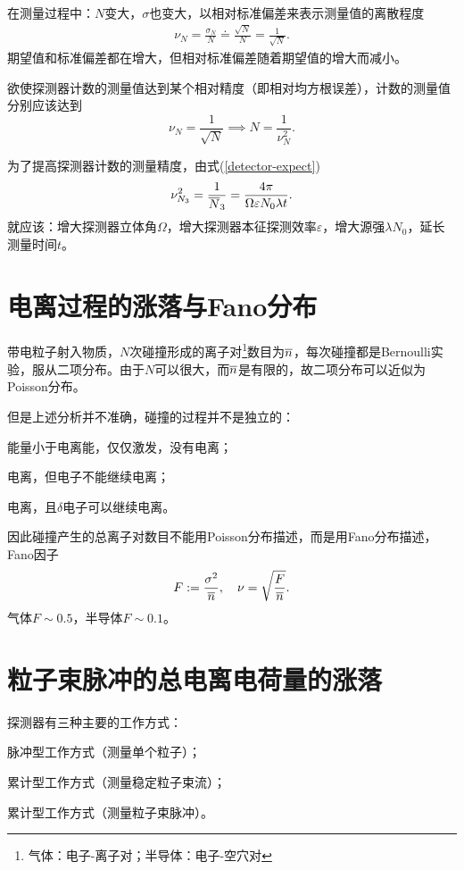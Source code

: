 在测量过程中：$N$变大，$\sigma$也变大，以相对标准偏差来表示测量值的离散程度
\begin{align}
	\nu_N=\frac{\sigma_N}N\doteq\frac{\sqrt N}N=\frac1{\sqrt N}.
\end{align}
期望值和标准偏差都在增大，但相对标准偏差随着期望值的增大而减小。

欲使探测器计数的测量值达到某个相对精度（即相对均方根误差），计数的测量值分别应该达到
\[
	\nu_N=\frac1{\sqrt N}\implies N=\frac1{\nu_N^2}.
\]

为了提高探测器计数的测量精度，由式(\ref{detector-expect})
\[
	\nu_{N_3}^2=\frac1{\overline{N}_3}=\frac{4\pi}{\Omega\varepsilon N_0\lambda t}.
\]
就应该：增大探测器立体角$\Omega$，增大探测器本征探测效率$\varepsilon$，增大源强$\lambda N_0$，延长测量时间$t$。

\section{电离过程的涨落与Fano分布}

带电粒子射入物质，$N$次碰撞形成的离子对\footnote{气体：电子-离子对；半导体：电子-空穴对}数目为$\overline{n}$，每次碰撞都是Bernoulli实验，服从二项分布。由于$N$可以很大，而$\overline{n}$是有限的，故二项分布可以近似为Poisson分布。

但是上述分析并不准确，碰撞的过程并不是独立的：
\begin{compactenum}
	\item 能量小于电离能，仅仅激发，没有电离；
	\item 电离，但电子不能继续电离；
	\item 电离，且$\delta$电子可以继续电离。
\end{compactenum}
因此碰撞产生的总离子对数目不能用Poisson分布描述，而是用Fano分布描述，Fano因子
\begin{align}
	F:=\frac{\sigma^2}{\overline{n}},\quad\nu=\sqrt{\frac F{\overline{n}}}.
\end{align}
气体$F\sim 0.5$，半导体$F\sim 0.1$。

\section{粒子束脉冲的总电离电荷量的涨落}

探测器有三种主要的工作方式：
\begin{compactitem}
	\item 脉冲型工作方式（测量单个粒子）；
	\item 累计型工作方式（测量稳定粒子束流）；
	\item 累计型工作方式（测量粒子束脉冲）。
\end{compactitem}
